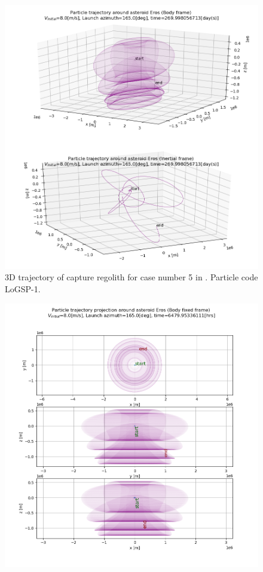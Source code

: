 \documentclass[print]{tudelft-report}
\begin{document}
\begin{appendices}
\begin{figure}[htb]
    \includegraphics[width=\textwidth, height=\textheight]{Results/Images/longest_edge_perturbations/3.2Density_1cmSize/3dTrajectory_8ms_165Azimuth_45solarPhase.png}
    \caption{3D trajectory of capture regolith for case number 5 in . Particle code LoGSP-1.}
    \label{fig:LoGSP_1_capture_case_8_3d_trajectory}
    \end{figure}
    \FloatBarrier
    \begin{figure}[htb]
    \centering
    \captionsetup{justification=centering}
    \includegraphics[width=\textwidth, height=\textheight]{Results/Images/longest_edge_perturbations/3.2Density_1cmSize/2dTrajectory_8ms_165Azimuth_45solarPhase_bodyFrame.png}

\end{figure}
\end{appendices}
\end{document}
